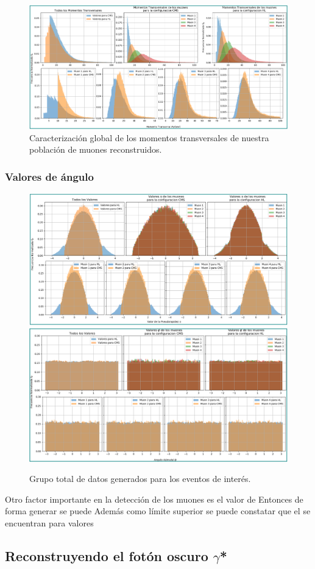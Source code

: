 \begin{figure}[!t]
\centering
\includegraphics[width=.8\textwidth]{Simulacion/imagenes/Datos_PT_ALL.png}
\caption{Caracterización global de los momentos transversales de nuestra población de muones reconstruidos.}
\label{procesos_darksusy_PTyISO}
\end{figure}



\subsubsection{Valores de ángulo}
\begin{figure}[!t]
\centering
\includegraphics[width=.8\textwidth]{Simulacion/imagenes/Datos_Eta_ALL.png}
\includegraphics[width=.8\textwidth]{Simulacion/imagenes/Datos_Phi_ALL.png}
\caption{Grupo total de datos generados para los eventos de interés.}
\label{procesos_darksusy_ETAyPHI}
\end{figure}





Otro factor importante en la detección de los muones es el valor de Entonces de forma generar se puede Además como límite superior se puede constatar que el  se encuentran para valores 


\subsection{Reconstruyendo el fotón oscuro $\gamma$*}











